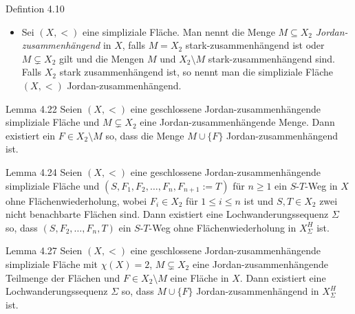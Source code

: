 \documentclass{beamer}
\begin{document}
\begin{frame}
\begin{block}{Defintion 4.10}
\begin{itemize}
\item Sei $(X,<)$ eine simpliziale Fläche. Man nennt die Menge $M \subseteq X_2$ \emph{Jordan-zusammenhängend} in $X$, falls $M=X_2$ stark-zusammenhängend ist oder  $M \subsetneq X_2$ gilt und die Mengen $M$ und $X_2\setminus M$ stark-zusammenhängend sind. Falls $X_2$ stark zusammenhängend ist, so nennt man die simpliziale Fläche $(X,<)$ Jordan-zusammenhängend.
\end{itemize}
\end{block}
\end{frame}
\begin{frame}
\begin{block}{Lemma 4.22}
Seien $(X,<)$  eine geschlossene Jordan-zusammenhängende simpliziale Fläche und $M \subsetneq X_2$ eine Jordan-zusammenhängende Menge. Dann existiert ein $F\in X_2\setminus M$ so, dass die Menge $M \cup \{F\}$ Jordan-zusammenhängend ist.
\end{block}
\end{frame}
\begin{frame}
\begin{block}{Lemma 4.24}
Seien $(X,<)$ eine geschlossene Jordan-zusammenhängende simpliziale Fläche und $(S,F_1,F_2,\ldots,F_n,F_{n+1}:=T)$ für $n\geq 1$ ein $S$-$T$-Weg in $X$ ohne Flächenwiederholung, wobei $F_i \in X_2$ für $1 \leq i \leq n$ ist und $S,T\in X_2$ zwei nicht benachbarte Flächen sind. 
Dann existiert eine Lochwanderungssequenz $\Sigma$ so, dass $(S,F_2, \ldots,F_n,T)$ ein $S$-$T$-Weg ohne Flächenwiederholung in $X^H_{\Sigma}$ ist.
\end{block}
\end{frame}

\begin{frame}
\begin{block}{Lemma 4.27}
 Seien $(X,<)$ eine geschlossene Jordan-zusammenhängende simpliziale Fläche mit $\chi(X)=2$, $M \subsetneq X_2$ eine Jordan-zusammenhängende Teilmenge der Flächen und $F \in X_2\setminus M$ eine Fläche in $X$. Dann existiert eine Lochwanderungssequenz $\Sigma$ so, dass $M \cup \{F\}$ Jordan-zusammenhängend in $X^H_{\Sigma}$ ist.

\end{block}
\end{frame}
\end{document}
